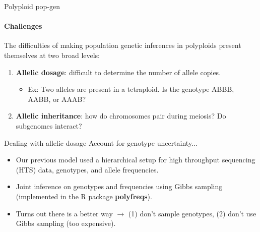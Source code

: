 \documentclass[presentation,sansserif]{beamer}
\begin{document}
\begin{frame}[t]{Polyploid pop-gen}
  \framesubtitle{Challenges}
  
  \vspace{0.1in}
  The difficulties of making population genetic inferences in polyploids present themselves at two broad levels:
  \vspace{0.2in}
  \pause

	\begin{enumerate}
		\item \textbf{Allelic dosage}: difficult to determine the number of allele copies.
		\vspace{0.1in}
		
		\begin{itemize}
			\item Ex: Two alleles are present in a tetraploid. Is the genotype ABBB, AABB, or AAAB?
		\end{itemize}
		\vspace{0.2in}
		\pause

		\item \textbf{Allelic inheritance}: how do chromosomes pair during meiosis? Do subgenomes interact?
	\end{enumerate}
	
\end{frame}

\begin{frame}[t]{Dealing with allelic dosage}
	\pause
	\vspace{0.1in}
	Account for genotype uncertainty...
	\vspace{0.2in}

	\begin{itemize}
	\setlength\itemsep{0.2in}
		\item Our previous model used a hierarchical setup for high throughput sequencing (HTS) data, genotypes, and allele frequencies.
		\vspace{0.1in}
		\pause

		\item Joint inference on genotypes and frequencies using Gibbs sampling (implemented in the R package \textbf{polyfreqs}).
		\vspace{0.1in}
		\pause

		\item Turns out there is a better way \pause $\rightarrow$ (1) don't sample genotypes\pause, (2) don't use Gibbs sampling (too expensive).
		\vspace{0.1in}

	\end{itemize}

\end{frame}
\end{document}
